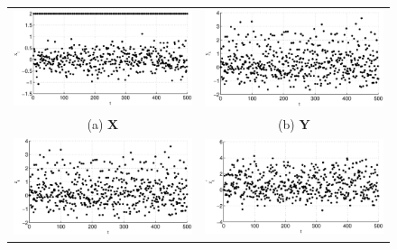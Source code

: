 \documentclass{article}[10pt]
\begin{document}
\begin{figure}[ht]
\begin{tabular}{cc}
\includegraphics[scale=0.48]{NoisyMultiResponseExample_X.eps} & \includegraphics[scale=0.48]{NoisyMultiResponseExample_Y.eps} \\
(a) $\mathbf{X}$ & (b) $\mathbf{Y}$ \\
\includegraphics[scale=0.48]{NoisyMultiResponseExample_z1.eps} & \includegraphics[scale=0.48]{NoisyMultiResponseExample_z2.eps} \\

\end{tabular}
\end{figure}
\end{document}
